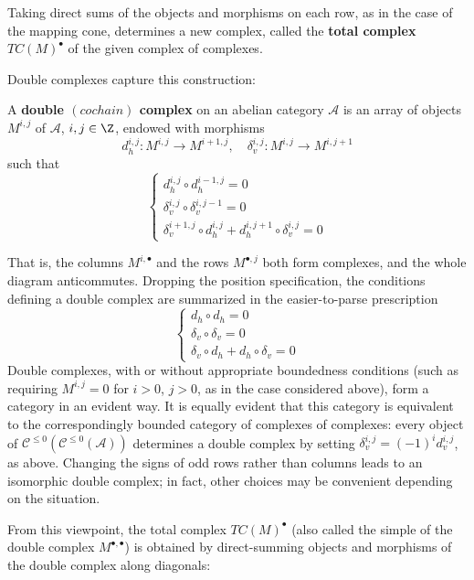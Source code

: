 Taking direct sums of the objects and morphisms on each row, as in the case of the mapping cone, determines a new complex, called the \textbf{total complex} $TC(M)^\bullet$ of the given complex of complexes.\par
Double complexes capture this construction:
\begin{definition}
A \textbf{double $(cochain)$ complex} on an abelian category $\mathcal{A}$ is an array of objects $M^{i,j}$ of $\mathcal{A}$, $i,j\in\Z$, endowed with morphisms
\[d^{i,j}_h:M^{i,j}\to M^{i+1,j},\quad \delta^{i,j}_v:M^{i,j}\to M^{i,j+1}\]
such that
\[\left\{\begin{array}{l}
d_h^{i,j}\circ d_h^{i-1,j}=0\\
\delta_v^{i,j}\circ\delta_v^{i,j-1}=0\\
\delta^{i+1,j}_v\circ d_h^{i,j}+d^{i,j+1}_h\circ\delta^{i,j}_v=0
\end{array}\right. \]
\end{definition}
That is, the columns $M^{i,\bullet}$ and the rows $M^{\bullet,j}$ both form complexes, and the whole diagram anticommutes. Dropping the position specification, the conditions defining a double complex are summarized in the easier-to-parse prescription
\[\left\{\begin{array}{l}
d_h\circ d_h=0\\
\delta_v\circ\delta_v=0\\
\delta_v\circ d_h+d_h\circ\delta_v=0
\end{array}\right. \]
Double complexes, with or without appropriate boundedness conditions (such as requiring $M^{i,j}=0$ for $i>0$, $j>0$, as in the case considered above), form a category in an evident way. It is equally evident that this category is equivalent to the correspondingly bounded category of complexes of complexes: every object of $\mathcal{C}^{\leq0}(\mathcal{C}^{\leq0}(\mathcal{A}))$ determines a double complex by setting $\delta^{i,j}_v=(-1)^id^{i,j}_v$, as above.
Changing the signs of odd rows rather than columns leads to an isomorphic double complex; in fact, other choices may be convenient depending on the
situation.\par
From this viewpoint, the total complex $TC(M)^\bullet$ (also called the simple of the double complex $M^{\bullet,\bullet}$) is obtained by direct-summing objects and morphisms of the double complex along diagonals:
